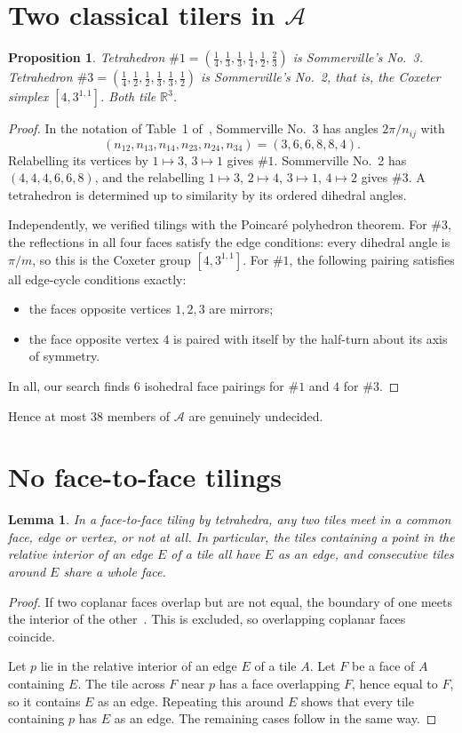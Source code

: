 \documentclass[11pt]{amsart}
\newtheorem{proposition}[theorem]{Proposition}
\newtheorem{lemma}[theorem]{Lemma}
\theoremstyle{definition}
\newcommand{\cA}{\mathscr{A}}
\newcommand{\R}{\mathbb{R}}
\begin{document}
\section{Two classical tilers in $\cA$}
\begin{proposition}\label{prop:somm}
Tetrahedron $\#1=(\frac14,\frac13,\frac13,\frac14,\frac12,\frac23)$ is Sommerville's No.~3. Tetrahedron
$\#3=(\frac14,\frac12,\frac12,\frac13,\frac13,\frac12)$ is Sommerville's No.~2, that is, the Coxeter simplex
$[4,3^{1,1}]$. Both tile $\R^3$.
\end{proposition}
\begin{proof}
In the notation of Table~1 of~\cite{BDKS}, Sommerville No.~3 has angles $2\pi/n_{ij}$ with
\[(n_{12},n_{13},n_{14},n_{23},n_{24},n_{34})=(3,6,6,8,8,4).\]
Relabelling its vertices by $1\mapsto3$, $3\mapsto1$ gives
$\#1$. Sommerville No.~2 has $(4,4,4,6,6,8)$, and the relabelling $1\mapsto3$, $2\mapsto4$, $3\mapsto1$, $4\mapsto2$ gives
$\#3$. A tetrahedron is determined up to similarity by its ordered dihedral angles.

Independently, we verified tilings with the Poincar\'e polyhedron theorem. For $\#3$, the reflections in all four faces
satisfy the edge conditions: every dihedral angle is $\pi/m$, so this is the Coxeter group $[4,3^{1,1}]$. For $\#1$,
the following pairing satisfies all edge-cycle conditions exactly:
\begin{itemize}[leftmargin=1.5em]
\item the faces opposite vertices $1,2,3$ are mirrors;
\item the face opposite vertex $4$ is paired with itself by the half-turn about its axis of symmetry.
\end{itemize}
In all, our search finds $6$ isohedral face pairings for $\#1$ and $4$ for $\#3$.
\end{proof}

Hence at most $38$ members of $\cA$ are genuinely undecided.

\section{No face-to-face tilings}
\begin{lemma}\label{lem:complex}
In a face-to-face tiling by tetrahedra, any two tiles meet in a common face, edge or vertex, or not at all. In
particular, the tiles containing a point in the relative interior of an edge $E$ of a tile all have $E$ as an edge, and
consecutive tiles around $E$ share a whole face.
\end{lemma}
\begin{proof}
If two coplanar faces overlap but are not equal, the boundary of one meets the interior of the other~\cite[Lemma~2.6]{CS}.
This is excluded, so overlapping coplanar faces coincide.

Let $p$ lie in the relative interior of an edge $E$ of a tile $A$. Let $F$ be a face of $A$ containing $E$. The tile
across $F$ near $p$ has a face overlapping $F$, hence equal to $F$, so it contains $E$ as an edge. Repeating this around
$E$ shows that every tile containing $p$ has $E$ as an edge. The remaining cases follow in the same way.
\end{proof}
\end{document}
